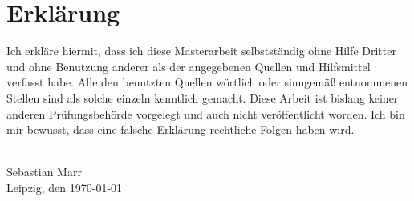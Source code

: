 \chapter*{Erklärung}

Ich erkläre hiermit, dass ich diese Masterarbeit selbstständig ohne Hilfe Dritter und ohne Benutzung anderer als der angegebenen Quellen und Hilfsmittel verfasst habe. Alle den benutzten Quellen wörtlich oder sinngemäß entnommenen Stellen sind als solche einzeln kenntlich gemacht. Diese Arbeit ist bislang keiner anderen Prüfungsbehörde vorgelegt und auch nicht veröffentlicht worden. Ich bin mir bewusst, dass eine falsche Erklärung rechtliche Folgen haben wird. 

{
\vspace{32pt}
\noindent
\hdashrule{5cm}{1pt}{1pt 3pt}\\
Sebastian Marr\\
Leipzig, den \today
}
